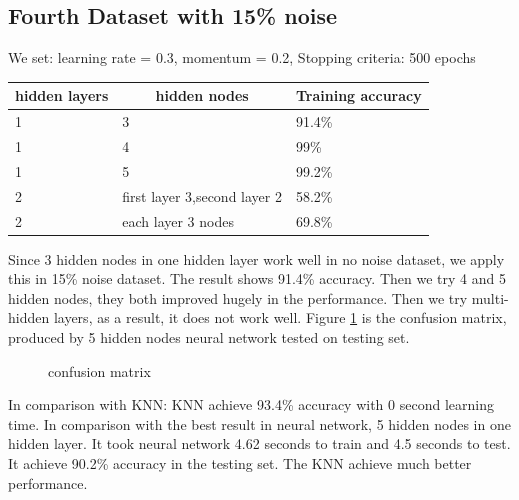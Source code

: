 \documentclass[11pt, a4paper, oneside, openright]{article}
\begin{document}
\subsection{Fourth Dataset with 15\% noise}
We set:  learning rate = 0.3, momentum = 0.2, Stopping criteria: 500 epochs
\begin{table}[H]
\centering
\begin{tabular}{|l|l|l|}
\hline
\multicolumn{1}{|c|}{\textbf{hidden layers}} & \multicolumn{1}{c|}{\textbf{hidden nodes}} 
& \multicolumn{1}{c|}{\textbf{Training accuracy}}\\
\hline
1     &3 &91.4\%                                    \\
\hline
1    &4 &99\%                                  \\
\hline
1   &5 &99.2\%                                             \\
\hline
2 &first layer 3,second layer 2  &58.2\%                                            \\
\hline
2  &each layer 3 nodes &69.8\%                                              \\
\hline
\end{tabular}
\end{table}

Since 3 hidden nodes in one hidden layer work well in no noise dataset, we apply this in 15\% noise dataset. The result shows 91.4\% accuracy. Then we try 4 and 5 hidden nodes, they both improved hugely in the performance. Then we try multi-hidden layers, as a result, it does not work well.
Figure \ref{fig:confusion_2} is the confusion matrix, produced by 5 hidden nodes neural network tested on testing set.
  \begin{figure}[!ht]
  \centerline{}
  \caption{confusion matrix}
  \label{fig:confusion_2}
  \end{figure}
\newline In comparison with KNN:
KNN achieve 93.4\% accuracy with 0 second learning time.
In comparison with the best result in neural network, 5 hidden nodes in one hidden layer. It took neural network 4.62 seconds to train and 4.5 seconds to test. It achieve 90.2\% accuracy in the testing set. The KNN achieve much better performance.
\end{document}
